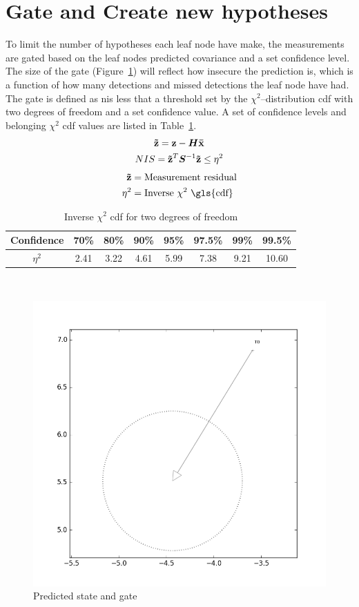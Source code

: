 \section{Gate and Create new hypotheses}
To limit the number of hypotheses each leaf node have make, the measurements are gated based on the leaf nodes predicted covariance and a set confidence level. The size of the gate (Figure~\ref{fig:gate_illustration}) will reflect how insecure the prediction is, which is a function of how many detections and missed detections the leaf node have had. The gate is defined as \gls{nis} less that a threshold set by the \(\chi^2\)--distribution \gls{cdf} with two degrees of freedom and a set confidence value. A set of confidence levels and belonging \(\chi^2\) \gls{cdf} values are listed in Table~\ref{tab:chi_square}.
\begin{equation}\label{eq:gate}
\begin{gathered}
\boldsymbol{\mathbf{\tilde{z}}} = \boldsymbol{\mathbf{z}} - \bm{H}\boldsymbol{\mathbf{\bar{x}}} \\
NIS = \boldsymbol{\mathbf{\tilde{z}}}^T	\bm{S}^{-1} \boldsymbol{\mathbf{\tilde{z}}} \leq \eta^2
\end{gathered}
\end{equation}
\begin{equation*}
\begin{split}
\V{\tilde{z}}	&= \text{Measurement residual}  \\
\eta^2 			&= \text{Inverse \(\chi^2\) \gls{cdf}} \\
\end{split}
\end{equation*}
\begin{table}
\centering
\begin{tabular}{c c c c c c c c}
Confidence 	& 70\% 	& 80\% 	& 90\% 	& 95\% 	& 97.5\% 	& 99\% 	& 99.5\% \\ 
\midrule
\(\eta^2\) 	& 2.41 	& 3.22 	& 4.61 	& 5.99 	& 7.38 		& 9.21 	& 10.60
\end{tabular}\caption{Inverse \(\chi^2\) \gls{cdf} for two degrees of freedom}
~\label{tab:chi_square}
\end{table}
\begin{figure}
\centering
\includegraphics[width = .7\textwidth]{Figures/gate_without_measurement.png}
\caption{Predicted state and gate}\label{fig:gate_illustration}
\end{figure}

